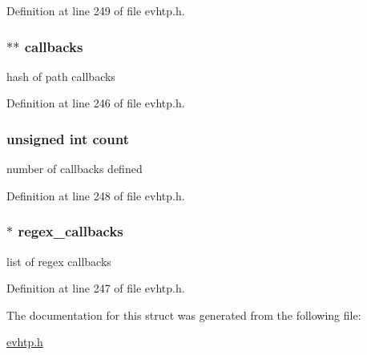 Definition at line 249 of file evhtp.h.

\hypertarget{structevhtp__callbacks__s_ae41f6bd6ab77be4d8bdd1eca69aad1a5}{
\subsubsection[{callbacks}]{$\ast$$\ast$ {\bf callbacks}}}
\label{structevhtp__callbacks__s_ae41f6bd6ab77be4d8bdd1eca69aad1a5}
hash of path callbacks 

Definition at line 246 of file evhtp.h.

\hypertarget{structevhtp__callbacks__s_a16ff2d8e15ade4948398b0aeb80124a8}{
\subsubsection[{count}]{\setlength{\rightskip}{0pt plus 5cm}unsigned int {\bf count}}}
\label{structevhtp__callbacks__s_a16ff2d8e15ade4948398b0aeb80124a8}
number of callbacks defined 

Definition at line 248 of file evhtp.h.

\hypertarget{structevhtp__callbacks__s_a02e0575e2349e04a2e6c77e7d84eedcd}{
\subsubsection[{regex\_\-callbacks}]{$\ast$ {\bf regex\_\-callbacks}}}
\label{structevhtp__callbacks__s_a02e0575e2349e04a2e6c77e7d84eedcd}
list of regex callbacks 

Definition at line 247 of file evhtp.h.



The documentation for this struct was generated from the following file:\begin{DoxyCompactItemize}
\item 
\hyperlink{evhtp_8h}{evhtp.h}\end{DoxyCompactItemize}
